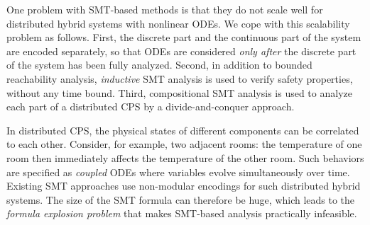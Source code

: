 One problem with  SMT-based methods is 
that they do not scale well for distributed hybrid systems with nonlinear ODEs.
We cope with this scalability problem as follows.
First, the discrete part and the continuous part of the system are
encoded separately, 
so that ODEs are considered \emph{only after} the discrete part of the
system has been  fully analyzed.
Second, in addition to bounded reachability analysis, \emph{inductive}
SMT analysis is used to verify safety properties,  without any time
bound. 
Third, compositional SMT analysis is used to analyze each part of a
distributed CPS by a divide-and-conquer approach. %



In distributed CPS, the 
physical states of different components can be  correlated to each other.
Consider, for example,  two adjacent rooms: the temperature of one room then immediately affects the
temperature of the other room. %
Such  behaviors  are  specified as \emph{coupled} ODEs
where variables evolve simultaneously over  time.
Existing SMT approaches use  non-modular encodings
for such distributed hybrid systems. 
%
The size of the SMT formula can therefore be huge, which 
 leads to the \emph{formula explosion problem}
that makes  SMT-based analysis practically infeasible.

